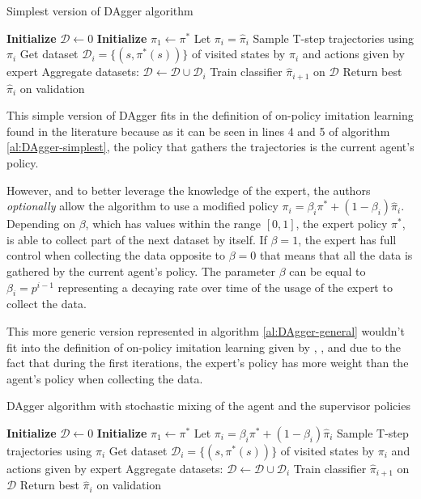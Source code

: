 \begin{algorithm}[H]
\caption{Simplest version of DAgger algorithm }
\begin{algorithmic}[1]
\State \textbf{Initialize} $\mathcal{D} \leftarrow 0$ 
\State \textbf{Initialize} $\hat{\pi}_1 \leftarrow \pi^*$ 
\State Let $\pi_i = \hat{\pi}_i$
\State Sample T-step trajectories using $\pi_i$
\State Get dataset  $\mathcal{D}_i = \{(s, \pi^*(s))\}$ of visited states by $\pi_i$ and actions given by expert
\State Aggregate datasets:  $\mathcal{D} \leftarrow \mathcal{D} \cup  \mathcal{D}_i$
\State  Train classifier $\hat{\pi}_{i+1}$ on $\mathcal{D}$
\EndFor
\State Return best $\hat{\pi}_i$ on validation
\end{algorithmic}
\label{al:DAgger-simplest}
\end{algorithm}

This simple version of DAgger fits in the definition of on-policy imitation learning found in the literature because as it can be seen in lines 4 and 5 of algorithm \ref{al:DAgger-simplest}, the policy that gathers the trajectories is the current agent's policy.


However, and to better leverage the knowledge of the expert, the authors \textit{optionally} allow the algorithm to use a modified policy $\pi_i=\beta_i\pi^*+ (1−\beta_i)\hat{\pi}_i$. Depending on $\beta$,  which has values within the range $[0,1]$, the expert policy $\pi^*$, is able to collect part of the next dataset by itself. If $\beta = 1$, the expert has full control when collecting the data opposite to $\beta=0$  that means that all the data is gathered by the current agent's policy. The parameter $\beta$ can be equal to $\beta_i=p^{i−1}$ representing a decaying rate over time of the usage of the expert to collect the data.


This more generic version represented in algorithm \ref{al:DAgger-general} wouldn't fit into the definition of on-policy imitation learning given by \cite{Osa:2018}, \cite{DBLP:journals/corr/LaskeyLHLMFG17}, \cite{OtherLaskeydefinitions:2019} and \cite{Anotherdefinitionfromberkeley:2020} due to the fact that during the first iterations, the expert's policy has more weight than the agent's policy when collecting the data.


\begin{algorithm}[H]
\caption{DAgger algorithm with stochastic mixing of the agent and the supervisor policies }
\begin{algorithmic}[1]
\State \textbf{Initialize} $\mathcal{D} \leftarrow 0$ 
\State \textbf{Initialize} $\hat{\pi}_1 \leftarrow \pi^*$ 
\State Let $\pi_i = \beta_i\pi^* + (1 -\beta_i)\hat{\pi}_i$
\State Sample T-step trajectories using $\pi_i$
\State Get dataset  $\mathcal{D}_i = \{(s, \pi^*(s))\}$ of visited states by $\pi_i$ and actions given by expert
\State Aggregate datasets:  $\mathcal{D} \leftarrow \mathcal{D} \cup  \mathcal{D}_i$
\State  Train classifier $\hat{\pi}_{i+1}$ on $\mathcal{D}$
\EndFor
\State Return best $\hat{\pi}_i$ on validation
\end{algorithmic}
\label{al:DAgger-general}
\end{algorithm}

